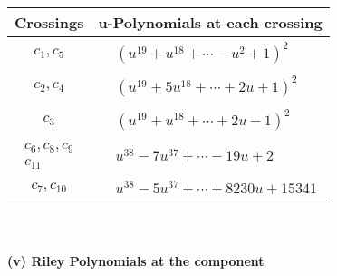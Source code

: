 \documentclass[1p]{elsarticle_modified}
\theoremstyle{definition}
\begin{document}
\begin{tabular}{m{50pt}|m{274pt}}
Crossings & \hspace{64pt}u-Polynomials at each crossing \\
\hline $$\begin{aligned}c_{1},c_{5}\end{aligned}$$&$\begin{aligned}
&(u^{19}+u^{18}+\cdots- u^2+1)^{2}
\end{aligned}$\\
\hline $$\begin{aligned}c_{2},c_{4}\end{aligned}$$&$\begin{aligned}
&(u^{19}+5 u^{18}+\cdots+2 u+1)^{2}
\end{aligned}$\\
\hline $$\begin{aligned}c_{3}\end{aligned}$$&$\begin{aligned}
&(u^{19}+u^{18}+\cdots+2 u-1)^{2}
\end{aligned}$\\
\hline $$\begin{aligned}c_{6},c_{8},c_{9}\\c_{11}\end{aligned}$$&$\begin{aligned}
&u^{38}-7 u^{37}+\cdots-19 u+2
\end{aligned}$\\
\hline $$\begin{aligned}c_{7},c_{10}\end{aligned}$$&$\begin{aligned}
&u^{38}-5 u^{37}+\cdots+8230 u+15341
\end{aligned}$\\
\hline
\end{tabular}\\~\\
\newpage\renewcommand{\arraystretch}{1}
\flushleft \textbf{(v) Riley Polynomials at the component}\newline \\
\end{document}
